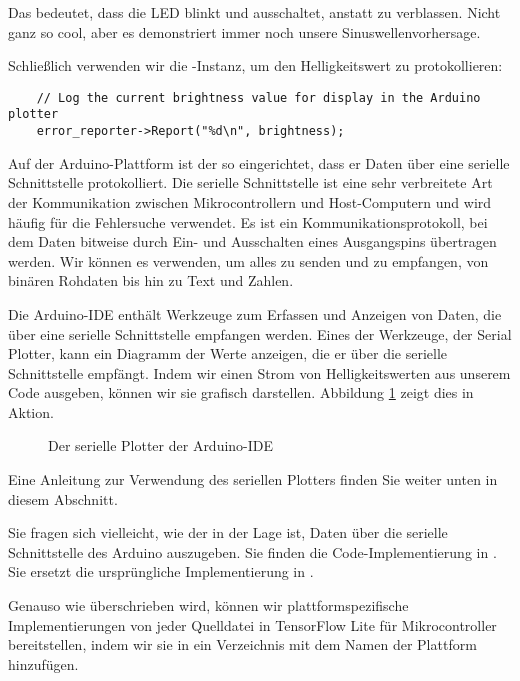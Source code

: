 Das bedeutet, dass die LED blinkt und ausschaltet, anstatt zu verblassen. Nicht ganz so cool, aber es demonstriert immer noch unsere Sinuswellenvorhersage.

Schließlich verwenden wir die -Instanz, um den Helligkeitswert zu protokollieren:
     
\begin{lstlisting}
    // Log the current brightness value for display in the Arduino plotter
 	error_reporter->Report("%d\n", brightness);
\end{lstlisting}      
     
Auf der Arduino-Plattform ist der  so eingerichtet, dass er Daten über eine serielle Schnittstelle protokolliert. 	Die serielle Schnittstelle ist eine sehr verbreitete Art der Kommunikation zwischen Mikrocontrollern und Host-Computern und wird häufig für die Fehlersuche verwendet. Es ist ein Kommunikationsprotokoll, bei dem Daten bitweise durch Ein- und Ausschalten eines Ausgangspins übertragen werden. Wir können es verwenden, um alles zu senden und zu empfangen, von binären Rohdaten bis hin zu Text und Zahlen.
     
Die Arduino-IDE enthält Werkzeuge zum Erfassen und Anzeigen von Daten, die über eine serielle Schnittstelle empfangen werden. Eines der Werkzeuge, der Serial Plotter, kann ein Diagramm der Werte anzeigen, die er über die serielle Schnittstelle empfängt. Indem wir einen Strom von Helligkeitswerten aus unserem Code ausgeben, können wir sie grafisch darstellen. Abbildung \ref{fig:SerialPlotter} zeigt dies in Aktion.
 
\begin{figure}
    \centering
    
    \caption{Der serielle Plotter der Arduino-IDE}\label{fig:SerialPlotter}
\end{figure}
 	
 	
Eine Anleitung zur Verwendung des seriellen Plotters finden Sie weiter unten in diesem Abschnitt.
     
     
Sie fragen sich vielleicht, wie der  in der Lage ist, Daten über die serielle Schnittstelle des Arduino auszugeben. Sie finden die Code-Implementierung in . Sie ersetzt die ursprüngliche Implementierung in .

Genauso wie  überschrieben wird, können wir plattformspezifische Implementierungen von jeder Quelldatei in TensorFlow Lite für Mikrocontroller bereitstellen, indem wir sie in ein Verzeichnis mit dem Namen der Plattform hinzufügen.

